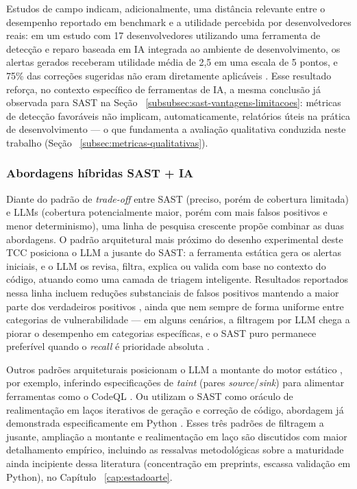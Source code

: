 Estudos de campo indicam, adicionalmente, uma distância relevante entre o desempenho reportado em benchmark e a utilidade percebida por desenvolvedores reais: em um estudo com 17 desenvolvedores utilizando uma ferramenta de detecção e reparo baseada em IA integrada ao ambiente de desenvolvimento, os alertas gerados receberam utilidade média de 2,5 em uma escala de 5 pontos, e 75\% das correções sugeridas não eram diretamente aplicáveis \cite{Steenhoek2025IDEUserStudy}. Esse resultado reforça, no contexto específico de ferramentas de IA, a mesma conclusão já observada para SAST na Seção ~\ref{subsubsec:sast-vantagens-limitacoes}: métricas de detecção favoráveis não implicam, automaticamente, relatórios úteis na prática de desenvolvimento — o que fundamenta a avaliação qualitativa conduzida neste trabalho (Seção ~\ref{subsec:metricas-qualitativas}).

\subsubsection{Abordagens híbridas SAST + IA}\label{subsubsec:hibrido-sast-ia}
Diante do padrão de \textit{trade-off} entre SAST (preciso, porém de cobertura limitada) e LLMs (cobertura potencialmente maior, porém com mais falsos positivos e menor determinismo), uma linha de pesquisa crescente propõe combinar as duas abordagens. O padrão arquitetural mais próximo do desenho experimental deste TCC posiciona o LLM a jusante do SAST: a ferramenta estática gera os alertas iniciais, e o LLM os revisa, filtra, explica ou valida com base no contexto do código, atuando como uma camada de triagem inteligente. Resultados reportados nessa linha incluem reduções substanciais de falsos positivos mantendo a maior parte dos verdadeiros positivos \cite{Ameen2026QASecClaw, Iranmanesh2025ZeroFalse, Agrawal2025SASTGenius}, ainda que nem sempre de forma uniforme entre categorias de vulnerabilidade — em alguns cenários, a filtragem por LLM chega a piorar o desempenho em categorias específicas, e o SAST puro permanece preferível quando o \textit{recall} é prioridade absoluta \cite{Ciavatta2026LLMSAST}.

Outros padrões arquiteturais posicionam o LLM a montante do motor estático , por exemplo, inferindo especificações de \textit{taint} (pares \textit{source}/\textit{sink}) para alimentar ferramentas como o CodeQL \cite{Li2025IRIS} . Ou utilizam o SAST como oráculo de realimentação em laços iterativos de geração e correção de código, abordagem já demonstrada especificamente em Python \cite{Alrashedy2025FDSP, Lee2026CodeEnhancer}. Esses três padrões de filtragem a jusante, ampliação a montante e realimentação em laço  são discutidos com maior detalhamento empírico, incluindo as ressalvas metodológicas sobre a maturidade ainda incipiente dessa literatura (concentração em preprints, escassa validação em Python), no Capítulo ~\ref{cap:estadoarte}.


